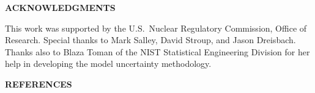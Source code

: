 \documentclass[fleqn,b5paper]{article}
\begin{document}
\vspace{\parskip}
{\bf ACKNOWLEDGMENTS}

This work was supported by the U.S.~Nuclear Regulatory Commission, Office of Research. Special thanks to Mark Salley, David Stroup, and Jason Dreisbach. Thanks also to Blaza Toman of the NIST Statistical Engineering Division for her help in developing the model uncertainty methodology.

\vspace{\parskip}
{\bf REFERENCES}
\vspace{-0.5in}

\renewcommand{\refname}{}

\end{document}
